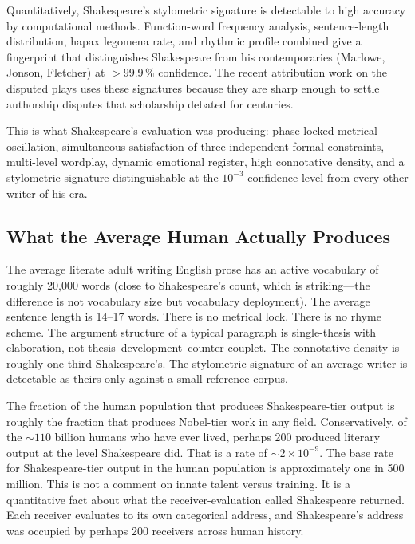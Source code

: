 \documentclass[11pt,twocolumn,a4paper]{article}
\theoremstyle{definition}
\theoremstyle{remark}
\begin{document}
Quantitatively, Shakespeare's stylometric signature is detectable to high
accuracy by computational methods.  Function-word frequency analysis,
sentence-length distribution, hapax legomena rate, and rhythmic profile
combined give a fingerprint that distinguishes Shakespeare from his
contemporaries (Marlowe, Jonson, Fletcher) at $>99.9\,\%$ confidence.  The
recent attribution work on the disputed plays uses these signatures because
they are sharp enough to settle authorship disputes that scholarship debated
for centuries.

This is what Shakespeare's evaluation was producing: phase-locked metrical
oscillation, simultaneous satisfaction of three independent formal constraints,
multi-level wordplay, dynamic emotional register, high connotative density, and
a stylometric signature distinguishable at the $10^{-3}$ confidence level from
every other writer of his era.

\subsection{What the Average Human Actually Produces}

The average literate adult writing English prose has an active vocabulary of
roughly 20{,}000 words (close to Shakespeare's count, which is striking---the
difference is not vocabulary size but vocabulary deployment).  The average
sentence length is 14--17 words.  There is no metrical lock.  There is no
rhyme scheme.  The argument structure of a typical paragraph is
single-thesis with elaboration, not thesis--development--counter-couplet.
The connotative density is roughly one-third Shakespeare's.  The stylometric
signature of an average writer is detectable as theirs only against a small
reference corpus.

The fraction of the human population that produces Shakespeare-tier output is
roughly the fraction that produces Nobel-tier work in any field.
Conservatively, of the $\sim\!110$ billion humans who have ever lived, perhaps
200 produced literary output at the level Shakespeare did.  That is a rate of
$\sim\!2\times10^{-9}$.  The base rate for Shakespeare-tier output in the
human population is approximately one in 500 million.  This is not a comment
on innate talent versus training.  It is a quantitative fact about what the
receiver-evaluation called Shakespeare returned.  Each receiver evaluates to
its own categorical address, and Shakespeare's address was occupied by perhaps
200 receivers across human history.
\end{document}
